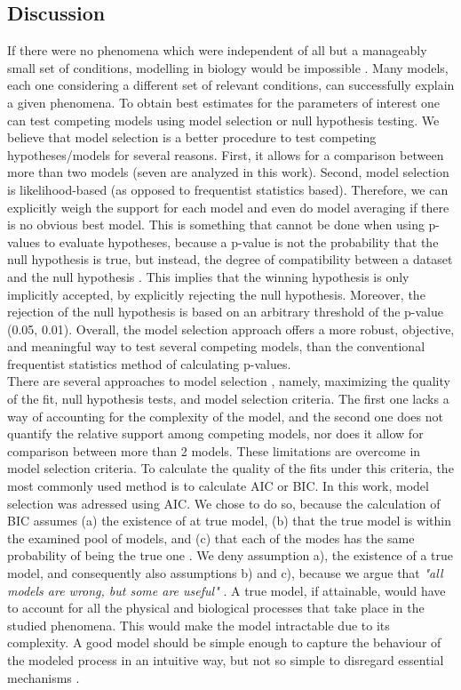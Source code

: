 \documentclass[titlepage,11pt]{article}
\begin{document}
\begin{linenumbers}
		\section{Discussion}
		If there were no phenomena which were independent of all but a manageably small set of conditions, modelling in biology would be impossible \cite{Wigner1995}. Many models, each one considering a different set of relevant conditions, can successfully explain a given phenomena.  To obtain best estimates for the parameters of interest one can test competing models using model selection or null hypothesis testing. We believe that model selection is a better procedure to test competing hypotheses/models for several reasons. First, it allows for a comparison between more than two models (seven are analyzed in this work). Second, model selection is likelihood-based (as opposed to frequentist statistics based). Therefore, we can explicitly weigh the support for each model and even do model averaging if there is no obvious best model. This is something that cannot be done when using p-values to evaluate hypotheses, because a p-value is not the probability that the null hypothesis is true, but instead, the degree of compatibility between a dataset and the null hypothesis \cite{RonaldL.Wasserstein, Kim2016}. This implies that the winning hypothesis is only implicitly accepted, by explicitly rejecting the null hypothesis. Moreover, the rejection of the null hypothesis is based on an arbitrary threshold of the p-value (0.05, 0.01). Overall, the model selection approach offers a more robust, objective, and meaningful way to test several competing models, than the conventional frequentist statistics method of calculating p-values. \\
		There are several approaches to model selection \cite{Johnson2004}, namely,  maximizing the quality of the fit, null hypothesis tests, and model selection criteria. The first one lacks a way of accounting for the complexity of the model, and the second one does not quantify the relative support among competing models, nor does it allow for comparison between more than 2 models. These limitations are overcome in model selection criteria. To calculate the quality of the fits under this criteria, the most commonly used method is to calculate AIC or BIC. In this work, model selection was adressed using AIC. We chose to do so, because the calculation of BIC assumes (a) the existence of at true model, (b) that the true model is within the examined pool of models, and (c) that each of the modes has the same probability of being the true one \cite{Johnson2004}. We deny assumption a), the existence of a true model, and consequently also assumptions b) and c), because we argue that  \textit{"all models are wrong, but some are useful"} \cite{Box1976, Box1979}. A true model, if attainable, would have to account for all the physical and biological processes that take place in the studied phenomena. This would make the model intractable due to its complexity. A good model should be simple enough to capture the behaviour of the modeled process in an intuitive way, but not so simple to disregard essential mechanisms \cite{Chatfield1995}. \\

\end{linenumbers}
\end{document}
